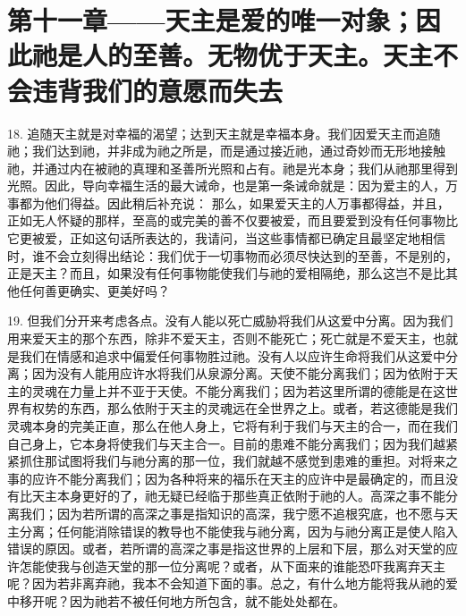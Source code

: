 \section{第十一章——天主是爱的唯一对象；因此祂是人的至善。无物优于天主。天主不会违背我们的意愿而失去}

18. 追随天主就是对幸福的渴望；达到天主就是幸福本身。我们因爱天主而追随祂；我们达到祂，并非成为祂之所是，而是通过接近祂，通过奇妙而无形地接触祂，并通过内在被祂的真理和圣善所光照和占有。祂是光本身；我们从祂那里得到光照。因此，导向幸福生活的最大诫命，也是第一条诫命就是：因为爱主的人，万事都为他们得益。因此稍后补充说： 那么，如果爱天主的人万事都得益，并且，正如无人怀疑的那样，至高的或完美的善不仅要被爱，而且要爱到没有任何事物比它更被爱，正如这句话所表达的，我请问，当这些事情都已确定且最坚定地相信时，谁不会立刻得出结论：我们优于一切事物而必须尽快达到的至善，不是别的，正是天主？而且，如果没有任何事物能使我们与祂的爱相隔绝，那么这岂不是比其他任何善更确实、更美好吗？\par

19. 但我们分开来考虑各点。没有人能以死亡威胁将我们从这爱中分离。因为我们用来爱天主的那个东西，除非不爱天主，否则不能死亡；死亡就是不爱天主，也就是我们在情感和追求中偏爱任何事物胜过祂。没有人以应许生命将我们从这爱中分离；因为没有人能用应许水将我们从泉源分离。天使不能分离我们；因为依附于天主的灵魂在力量上并不亚于天使。不能分离我们；因为若这里所谓的德能是在这世界有权势的东西，那么依附于天主的灵魂远在全世界之上。或者，若这德能是我们灵魂本身的完美正直，那么在他人身上，它将有利于我们与天主的合一，而在我们自己身上，它本身将使我们与天主合一。目前的患难不能分离我们；因为我们越紧紧抓住那试图将我们与祂分离的那一位，我们就越不感觉到患难的重担。对将来之事的应许不能分离我们；因为各种将来的福乐在天主的应许中是最确定的，而且没有比天主本身更好的了，祂无疑已经临于那些真正依附于祂的人。高深之事不能分离我们；因为若所谓的高深之事是指知识的高深，我宁愿不追根究底，也不愿与天主分离；任何能消除错误的教导也不能使我与祂分离，因为与祂分离正是使人陷入错误的原因。或者，若所谓的高深之事是指这世界的上层和下层，那么对天堂的应许怎能使我与创造天堂的那一位分离呢？或者，从下面来的谁能恐吓我离弃天主呢？因为若非离弃祂，我本不会知道下面的事。总之，有什么地方能将我从祂的爱中移开呢？因为祂若不被任何地方所包含，就不能处处都在。\par

